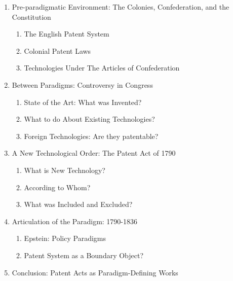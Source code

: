 \documentclass[pdftex,12pt,letterpaper]{article}
\begin{document}
\begin{enumerate}
\item{Pre-paradigmatic Environment: The Colonies, Confederation, and the Constitution}
	\begin{enumerate}
	\item{The English Patent System}
	\item{Colonial Patent Laws}
	\item{Technologies Under The Articles of Confederation}
	\end{enumerate}

\item{Between Paradigms: Controversy in Congress}
	\begin{enumerate}
	\item{State of the Art: What was Invented?}
	\item{What to do About Existing Technologies?}
	\item{Foreign Technologies: Are they patentable?}
	\end{enumerate}
	
\item{A New Technological Order: The Patent Act of 1790}
	\begin{enumerate}
	\item{What is New Technology?}
	\item{According to Whom?}
	\item{What was Included and Excluded?}
	\end{enumerate}
	
\item{Articulation of the Paradigm: 1790-1836}
	\begin{enumerate}
		\item{Epstein: Policy Paradigms}
		\item{Patent System as a Boundary Object?}
	\end{enumerate}

\item{Conclusion: Patent Acts as Paradigm-Defining Works}
\end{enumerate}

\printbibliography
\end{document}
